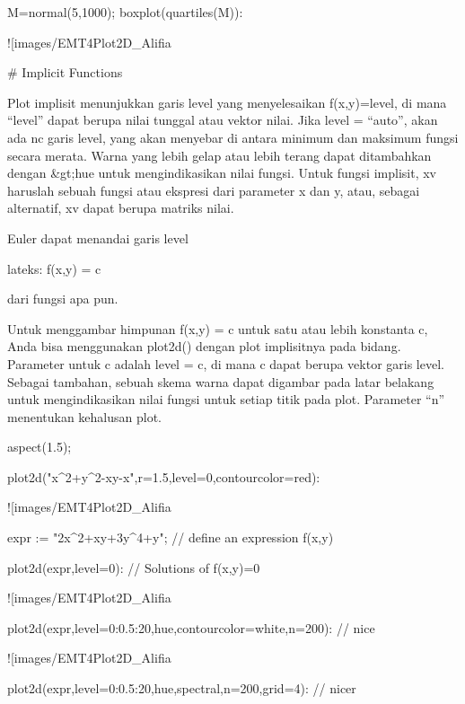 \documentclass{article}
\begin{document}
\>M=normal(5,1000); boxplot(quartiles(M)):


![images/EMT4Plot2D_Alifia%

# Implicit Functions

Plot implisit menunjukkan garis level yang menyelesaikan f(x,y)=level,
di mana “level” dapat berupa nilai tunggal atau vektor nilai. Jika
level = “auto”, akan ada nc garis level, yang akan menyebar di antara
minimum dan maksimum fungsi secara merata. Warna yang lebih gelap atau
lebih terang dapat ditambahkan dengan &gt;hue untuk mengindikasikan nilai
fungsi. Untuk fungsi implisit, xv haruslah sebuah fungsi atau ekspresi
dari parameter x dan y, atau, sebagai alternatif, xv dapat berupa
matriks nilai.


Euler dapat menandai garis level


lateks: f(x,y) = c


dari fungsi apa pun.


Untuk menggambar himpunan f(x,y) = c untuk satu atau lebih konstanta
c, Anda bisa menggunakan plot2d() dengan plot implisitnya pada bidang.
Parameter untuk c adalah level = c, di mana c dapat berupa vektor
garis level. Sebagai tambahan, sebuah skema warna dapat digambar pada
latar belakang untuk mengindikasikan nilai fungsi untuk setiap titik
pada plot. Parameter “n” menentukan kehalusan plot.


\>aspect(1.5); 

\>plot2d("x^2+y^2-x\*y-x",r=1.5,level=0,contourcolor=red):


![images/EMT4Plot2D_Alifia%

\>expr := "2\*x^2+x\*y+3\*y^4+y"; // define an expression f(x,y)

\>plot2d(expr,level=0): // Solutions of f(x,y)=0


![images/EMT4Plot2D_Alifia%

\>plot2d(expr,level=0:0.5:20,\>hue,contourcolor=white,n=200): // nice


![images/EMT4Plot2D_Alifia%

\>plot2d(expr,level=0:0.5:20,\>hue,\>spectral,n=200,grid=4): // nicer
\end{document}
